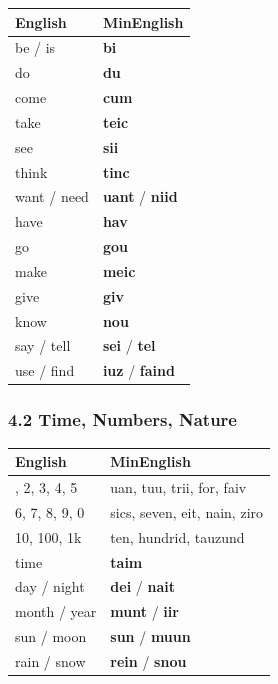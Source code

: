 {\def\LTcaptype{} %
\begin{longtable}[]{@{}ll@{}}
\toprule\noalign{}
English & MinEnglish \\
\midrule\noalign{}
\endhead
\bottomrule\noalign{}
\endlastfoot
be / is & \textbf{bi} \\
do & \textbf{du} \\
come & \textbf{cum} \\
take & \textbf{teic} \\
see & \textbf{sii} \\
think & \textbf{tinc} \\
want / need & \textbf{uant} / \textbf{niid} \\
have & \textbf{hav} \\
go & \textbf{gou} \\
make & \textbf{meic} \\
give & \textbf{giv} \\
know & \textbf{nou} \\
say / tell & \textbf{sei} / \textbf{tel} \\
use / find & \textbf{iuz} / \textbf{faind} \\
\end{longtable}
}

\subsubsection{4.2 Time, Numbers, Nature}\label{time-numbers-nature}

{\def\LTcaptype{} %
\begin{longtable}[]{@{}ll@{}}
\toprule\noalign{}
English & MinEnglish \\
\midrule\noalign{}
\endhead
\bottomrule\noalign{}
\endlastfoot
1, 2, 3, 4, 5 & uan, tuu, trii, for, faiv \\
6, 7, 8, 9, 0 & sics, seven, eit, nain, ziro \\
10, 100, 1k & ten, hundrid, tauzund \\
time & \textbf{taim} \\
day / night & \textbf{dei} / \textbf{nait} \\
month / year & \textbf{munt} / \textbf{iir} \\
sun / moon & \textbf{sun} / \textbf{muun} \\
rain / snow & \textbf{rein} / \textbf{snou} \\
\end{longtable}
}

